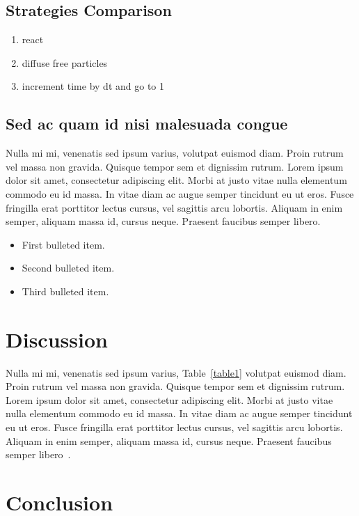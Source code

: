\documentclass[10pt,letterpaper]{article}
\begin{document}
\subsection*{Strategies Comparison}


\begin{enumerate}
	\item{react}
	\item{diffuse free particles}
	\item{increment time by dt and go to 1}
\end{enumerate}


\subsection*{Sed ac quam id nisi malesuada congue}

Nulla mi mi, venenatis sed ipsum varius, volutpat euismod diam. Proin rutrum vel massa non gravida. Quisque tempor sem et dignissim rutrum. Lorem ipsum dolor sit amet, consectetur adipiscing elit. Morbi at justo vitae nulla elementum commodo eu id massa. In vitae diam ac augue semper tincidunt eu ut eros. Fusce fringilla erat porttitor lectus cursus, vel sagittis arcu lobortis. Aliquam in enim semper, aliquam massa id, cursus neque. Praesent faucibus semper libero.

\begin{itemize}
	\item First bulleted item.
	\item Second bulleted item.
	\item Third bulleted item.
\end{itemize}

\section*{Discussion}
Nulla mi mi, venenatis sed ipsum varius, Table~\ref{table1} volutpat euismod diam. Proin rutrum vel massa non gravida. Quisque tempor sem et dignissim rutrum. Lorem ipsum dolor sit amet, consectetur adipiscing elit. Morbi at justo vitae nulla elementum commodo eu id massa. In vitae diam ac augue semper tincidunt eu ut eros. Fusce fringilla erat porttitor lectus cursus, vel sagittis arcu lobortis. Aliquam in enim semper, aliquam massa id, cursus neque. Praesent faucibus semper libero~\cite{bib3}.

\section*{Conclusion}
\end{document}
